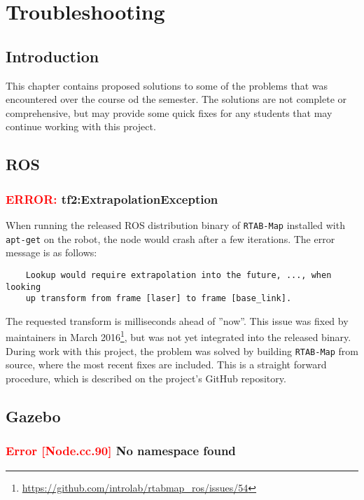 \chapter{Troubleshooting}

\section{Introduction}

This chapter contains proposed solutions to some of the problems that was encountered over the course od the semester. The solutions are not complete or comprehensive, but may provide some quick fixes for any students that may continue working with this project.

\section{ROS}

\subsection{\textcolor{red}{ERROR:} tf2:ExtrapolationException}
When running the released ROS distribution binary of \texttt{RTAB-Map} installed with \texttt{apt-get} on the robot, the node would crash after a few iterations. The error message is as follows:

\begin{verbatim}
	Lookup would require extrapolation into the future, ..., when looking 
	up transform from frame [laser] to frame [base_link].
\end{verbatim}

The requested transform is milliseconds ahead of ''now''. This issue was fixed by maintainers in March 2016\footnote{\url{https://github.com/introlab/rtabmap_ros/issues/54}}, but was not yet integrated into the released binary. During work with this project, the problem was solved by building \texttt{RTAB-Map} from source, where the most recent fixes are included. This is a straight forward procedure, which is described on the project's GitHub repository. 

\section{Gazebo}

\subsection{\textcolor{red}{Error [Node.cc.90]} No namespace found}

